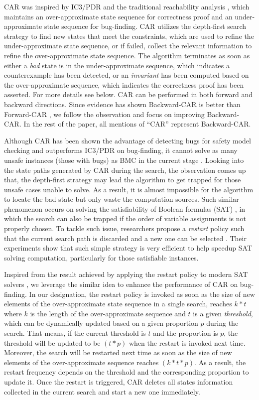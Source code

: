 CAR was inspired by IC3/PDR and the traditional reachability analysis \cite{LZZPV17}, which maintains an over-approximate state sequence for correctness proof and an under-approximate state sequence for bug-finding. CAR utilizes the depth-first search strategy to find new states that meet the constraints, which are used to refine the under-approximate state sequence, or if failed, collect the relevant  information to refine the over-approximate state sequence. The algorithm terminates as soon as either a \emph{bad} state is in the under-approximate sequence, which indicates a counterexample has been detected, or an \emph{invariant} has been computed based on the over-approximate sequence, which indicates the correctness proof has been asserted.  For more details see below. CAR can be performed in both forward and backward directions. Since evidence has shown Backward-CAR is better than Forward-CAR \cite{LDPRV18}, we follow the observation and focus on improving Backward-CAR. In the rest of the paper, all mentions of ``CAR'' represent Backward-CAR. 

Although CAR has been shown the advantage of detecting bugs for safety model checking and outperforms IC3/PDR on bug-finding, it cannot solve as many unsafe instances (those with bugs) as BMC in the current stage \cite{DLPVR19}. Looking into the state paths generated by CAR during the search, the observation comes up that, the depth-first strategy may lead the algorithm to get trapped for those unsafe cases unable to solve. As a result, it is almost impossible for the algorithm to locate the bad state but only waste the computation sources. Such similar phenomenon occurs on solving the satisfiability of Boolean formulas (SAT) \cite{VWM15}, in which the search can also be trapped if the order of variable assignments is not properly chosen. To tackle such issue, researchers propose a \emph{restart} policy such that the current search path is discarded and a new one can be selected \cite{Biere08}. Their experiments show that such simple strategy is very efficient to help speedup  SAT solving computation, particularly for those satisfiable instances. 

Inspired from the result achieved by applying the restart policy to modern SAT solvers \cite{b4}\cite{b5}, we leverage the similar idea to enhance the performance of CAR on bug-finding. In our designation, the restart policy is invoked as soon as the size of new elements of the over-approximate state sequence in a single search, reaches $k*t$ where $k$ is the length of the over-approximate sequence and $t$ is a given  \emph{threshold}, which can be dynamically updated based on a given proportion $p$ during the search. That means, if the current threshold is $t$ and the proportion is $p$, the threshold will be updated to be $(t*p)$ when the restart is invoked next time. Moreover, the search will be restarted next time as soon as the size of new elements of the over-approximate sequence reaches $(k*t*p)$. As a result, the restart frequency depends on the threshold and the corresponding proportion to update it. Once the restart is triggered, CAR deletes all states information collected in the current search and start a new one immediately. 


